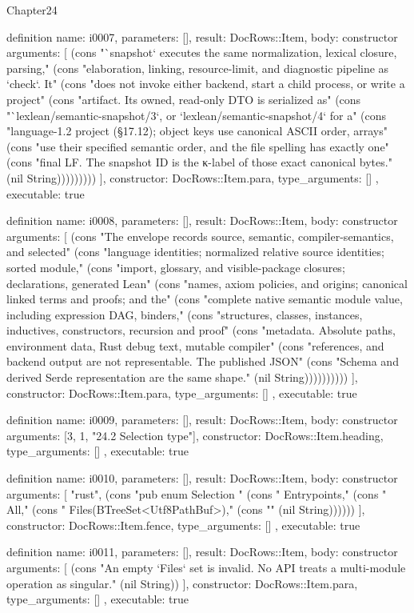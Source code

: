 \begin{lexlean}{Chapter24}
\begin{semanticmodule}
definition{
  name: i0007,
  parameters: [],
  result: DocRows::Item,
  body: constructor{
    arguments: [
      (cons "`snapshot` executes the same normalization, lexical closure, parsing," (cons "elaboration, linking, resource-limit, and diagnostic pipeline as `check`. It" (cons "does not invoke either backend, start a child process, or write a project" (cons "artifact. Its owned, read-only DTO is serialized as" (cons "`lexlean/semantic-snapshot/3`, or `lexlean/semantic-snapshot/4` for a" (cons "language-1.2 project (§17.12); object keys use canonical ASCII order, arrays" (cons "use their specified semantic order, and the file spelling has exactly one" (cons "final LF. The snapshot ID is the κ-label of those exact canonical bytes." (nil String)))))))))
    ],
    constructor: DocRows::Item.para,
    type_arguments: []
  },
  executable: true
}

definition{
  name: i0008,
  parameters: [],
  result: DocRows::Item,
  body: constructor{
    arguments: [
      (cons "The envelope records source, semantic, compiler-semantics, and selected" (cons "language identities; normalized relative source identities; sorted module," (cons "import, glossary, and visible-package closures; declarations, generated Lean" (cons "names, axiom policies, and origins; canonical linked terms and proofs; and the" (cons "complete native semantic module value, including expression DAG, binders," (cons "structures, classes, instances, inductives, constructors, recursion and proof" (cons "metadata. Absolute paths, environment data, Rust debug text, mutable compiler" (cons "references, and backend output are not representable. The published JSON" (cons "Schema and derived Serde representation are the same shape." (nil String))))))))))
    ],
    constructor: DocRows::Item.para,
    type_arguments: []
  },
  executable: true
}

definition{
  name: i0009,
  parameters: [],
  result: DocRows::Item,
  body: constructor{
    arguments: [3, 1, "24.2 Selection type"],
    constructor: DocRows::Item.heading,
    type_arguments: []
  },
  executable: true
}

definition{
  name: i0010,
  parameters: [],
  result: DocRows::Item,
  body: constructor{
    arguments: [
      "rust",
      (cons "pub enum Selection {" (cons "    Entrypoints," (cons "    All," (cons "    Files(BTreeSet<Utf8PathBuf>)," (cons "}" (nil String))))))
    ],
    constructor: DocRows::Item.fence,
    type_arguments: []
  },
  executable: true
}

definition{
  name: i0011,
  parameters: [],
  result: DocRows::Item,
  body: constructor{
    arguments: [
      (cons "An empty `Files` set is invalid. No API treats a multi-module operation as singular." (nil String))
    ],
    constructor: DocRows::Item.para,
    type_arguments: []
  },
  executable: true
}


\end{semanticmodule}
\end{lexlean}
